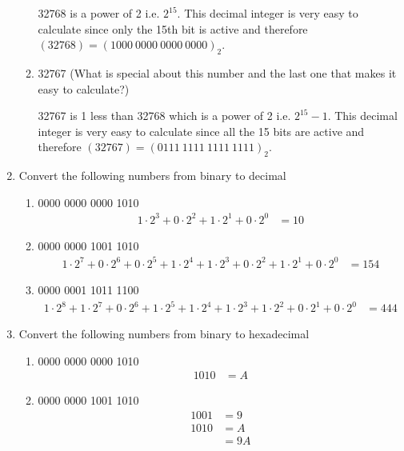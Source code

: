 \documentclass[12pt]{article}
\begin{document}
\begin{enumerate}
\begin{enumerate}
      32768 is a power of 2 i.e. $2^{15}$. This decimal integer is very easy to calculate since only the 15th bit is active and therefore $(32768) = (1000 \ 0000 \ 0000 \ 0000)_2$.

      \item 32767 (What is special about this number and the last one that makes it easy to calculate?)

      32767 is 1 less than 32768 which is a power of 2 i.e. $2^{15}-1$. This decimal integer is very easy to calculate since all the 15 bits are active and therefore $(32767) = (0111 \ 1111 \ 1111 \ 1111)_2$.

    \end{enumerate}

    \item Convert the following numbers from binary to decimal
    \begin{enumerate}
      \item 0000 0000 0000 1010
      \begin{align*}
        1 \cdot 2^3 + 0 \cdot 2^2 + 1 \cdot 2^1 + 0 \cdot 2^0 &= 10
      \end{align*}

      \item 0000 0000 1001 1010
      \begin{align*}
        1 \cdot 2^7 + 0 \cdot 2^6 + 0 \cdot 2^5 + 1 \cdot 2^4 + 1 \cdot 2^3 + 0 \cdot 2^2 + 1 \cdot 2^1 + 0 \cdot 2^0 &= 154
      \end{align*}

      \item 0000 0001 1011 1100
      \begin{align*}
        1 \cdot 2^8 + 1 \cdot 2^7 + 0 \cdot 2^6 + 1 \cdot 2^5 + 1 \cdot 2^4 + 1 \cdot 2^3 + 1 \cdot 2^2 + 0 \cdot 2^1 + 0 \cdot 2^0 &= 444
      \end{align*}

    \end{enumerate}

    \item Convert the following numbers from binary to hexadecimal
    \begin{enumerate}
      \item 0000 0000 0000 1010
      \begin{align*}
        1010 &= A
      \end{align*}

      \item 0000 0000 1001 1010
      \begin{align*}
        1001 &= 9 \\
        1010 &= A \\
        &= 9A
      \end{align*}


\end{enumerate}
\end{enumerate}
\end{document}
